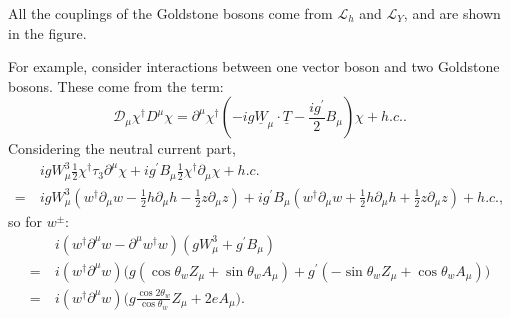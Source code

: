 All the couplings of the Goldstone bosons come from $\mathcal{L}_h$ and $\mathcal{L}_Y$, and are shown in the figure.
\begin{figure}[!h]
  \centering
  \hfill
  \hfill
\end{figure}
For example, consider interactions between one vector boson and two Goldstone bosons. These come from the term:
\begin{equation}
\mathcal{D}_\mu\chi^\dagger D^\mu \chi = \partial^\mu \chi^\dagger(-ig \underline{W}_\mu \cdot \underline{T} - \frac{ig^\prime}{2} B_\mu) \chi + h.c..
\end{equation}
Considering the neutral current part, 
\begin{equation}
\begin{split}
&igW_\mu^3 \frac{1}{2} \chi^\dagger \tau_3 \partial^\mu \chi + ig^\prime B_\mu \frac{1}{2} \chi^\dagger \partial_\mu \chi + h.c. \\
=\ &ig W_\mu^3(w^\dagger \partial_\mu w - \frac{1}{2} h \partial_\mu h - \frac{1}{2} z \partial_\mu z) + ig^\prime B_\mu (w^\dagger \partial_\mu w + \frac{1}{2} h \partial_\mu h + \frac{1}{2} z \partial_\mu z) + h.c.,
\end{split}
\end{equation}
so for $w^\pm$:
\begin{equation}
\begin{split}
&i(w^\dagger \partial^\mu w - \partial^\mu w^\dagger w)(g W_\mu^3 + g^\prime B_\mu) \\ 
=\ &i(w^\dagger \partial^\mu w)\bigg(g(\cos\theta_w Z_\mu + \sin\theta_w A_\mu) + g^\prime(-\sin\theta_w Z_\mu + \cos\theta_w A_\mu)\bigg) \\
=\ &i(w^\dagger \partial^\mu w)\bigg(g \frac{\cos 2 \theta_w}{\cos\theta_w} Z_\mu + 2e A_\mu \bigg).
\end{split}
\end{equation}
